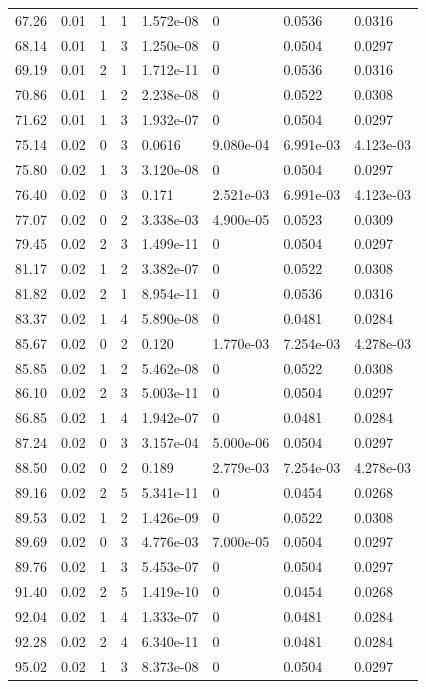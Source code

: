 \documentclass[preview]{standalone}
\begin{document}
{{{\begin{tabular}{L{1.2cm}C{1.2cm} C{0.3cm}C{0.5cm} C{1.4cm}C{1.4cm} C{1.4cm}C{1.4cm}}
  67.26  &  0.01  & 1     &  1 &  1.572e-08  & 0  & 0.0536 &  0.0316   \\ 
  68.14  &  0.01  & 1     &  3 &  1.250e-08  & 0  & 0.0504 &  0.0297   \\ 
  69.19  &  0.01  & 2     &  1 &  1.712e-11  & 0  & 0.0536 &  0.0316   \\ 
  70.86  &  0.01  & 1     &  2 &  2.238e-08  & 0  & 0.0522 &  0.0308   \\ 
  71.62  &  0.01  & 1     &  3 &  1.932e-07  & 0  & 0.0504 &  0.0297   \\ 
  75.14  &  0.02  & 0     &  3 &  0.0616  & 9.080e-04  & 6.991e-03 &  4.123e-03   \\ 
  75.80  &  0.02  & 1     &  3 &  3.120e-08  & 0  & 0.0504 &  0.0297   \\ 
  76.40  &  0.02  & 0     &  3 &  0.171  & 2.521e-03  & 6.991e-03 &  4.123e-03   \\ 
  77.07  &  0.02  & 0     &  2 &  3.338e-03  & 4.900e-05  & 0.0523 &  0.0309   \\ 
  79.45  &  0.02  & 2     &  3 &  1.499e-11  & 0  & 0.0504 &  0.0297   \\ 
  81.17  &  0.02  & 1     &  2 &  3.382e-07  & 0  & 0.0522 &  0.0308   \\ 
  81.82  &  0.02  & 2     &  1 &  8.954e-11  & 0  & 0.0536 &  0.0316   \\ 
  83.37  &  0.02  & 1     &  4 &  5.890e-08  & 0  & 0.0481 &  0.0284   \\ 
  85.67  &  0.02  & 0     &  2 &  0.120  & 1.770e-03  & 7.254e-03 &  4.278e-03   \\ 
  85.85  &  0.02  & 1     &  2 &  5.462e-08  & 0  & 0.0522 &  0.0308   \\ 
  86.10  &  0.02  & 2     &  3 &  5.003e-11  & 0  & 0.0504 &  0.0297   \\ 
  86.85  &  0.02  & 1     &  4 &  1.942e-07  & 0  & 0.0481 &  0.0284   \\ 
  87.24  &  0.02  & 0     &  3 &  3.157e-04  & 5.000e-06  & 0.0504 &  0.0297   \\ 
  88.50  &  0.02  & 0     &  2 &  0.189  & 2.779e-03  & 7.254e-03 &  4.278e-03   \\ 
  89.16  &  0.02  & 2     &  5 &  5.341e-11  & 0  & 0.0454 &  0.0268   \\ 
  89.53  &  0.02  & 1     &  2 &  1.426e-09  & 0  & 0.0522 &  0.0308   \\ 
  89.69  &  0.02  & 0     &  3 &  4.776e-03  & 7.000e-05  & 0.0504 &  0.0297   \\ 
  89.76  &  0.02  & 1     &  3 &  5.453e-07  & 0  & 0.0504 &  0.0297   \\ 
  91.40  &  0.02  & 2     &  5 &  1.419e-10  & 0  & 0.0454 &  0.0268   \\ 
  92.04  &  0.02  & 1     &  4 &  1.333e-07  & 0  & 0.0481 &  0.0284   \\ 
  92.28  &  0.02  & 2     &  4 &  6.340e-11  & 0  & 0.0481 &  0.0284   \\ 
  95.02  &  0.02  & 1     &  3 &  8.373e-08  & 0  & 0.0504 &  0.0297   \\ 
\hline 
\end{tabular} 

}}}
\end{document}
